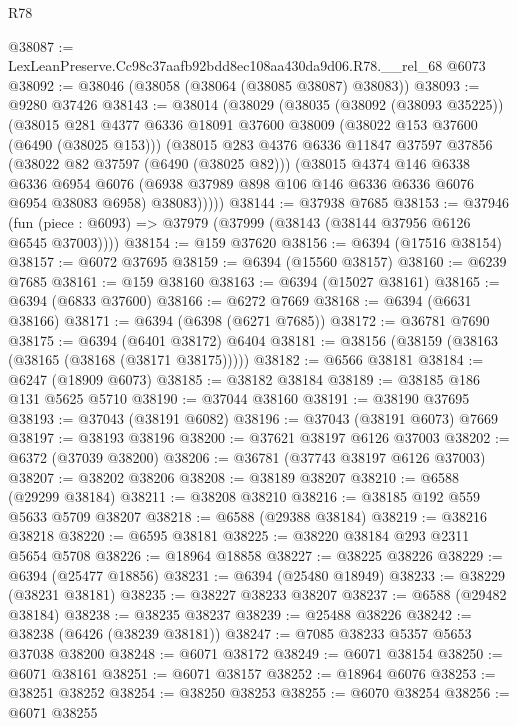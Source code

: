 \begin{lexlean}{R78}
\begin{coremodule}
@38087 := LexLeanPreserve.Cc98c37aafb92bdd8ec108aa430da9d06.R78.__rel_68 @6073
@38092 := @38046 (@38058 (@38064 (@38085 @38087) @38083))
@38093 := @9280 @37426
@38143 := @38014
    (@38029
      (@38035
        (@38092 (@38093 @35225))
        (@38015
          @281
          @4377
          @6336
          @18091
          @37600
          @38009
          (@38022 @153 @37600 (@6490 (@38025 @153)))
          (@38015
            @283
            @4376
            @6336
            @11847
            @37597
            @37856
            (@38022 @82 @37597 (@6490 (@38025 @82)))
            (@38015
              @4374
              @146
              @6338
              @6336
              @6954
              @6076
              (@6938 @37989 @898 @106 @146 @6336 @6336 @6076 @6954 @38083 @6958)
              @38083)))))
@38144 := @37938 @7685
@38153 := @37946
    (fun (piece : @6093) => @37979 (@37999 (@38143 (@38144 @37956 @6126 @6545 @37003))))
@38154 := @159 @37620
@38156 := @6394 (@17516 @38154)
@38157 := @6072 @37695
@38159 := @6394 (@15560 @38157)
@38160 := @6239 @7685
@38161 := @159 @38160
@38163 := @6394 (@15027 @38161)
@38165 := @6394 (@6833 @37600)
@38166 := @6272 @7669
@38168 := @6394 (@6631 @38166)
@38171 := @6394 (@6398 (@6271 @7685))
@38172 := @36781 @7690
@38175 := @6394 (@6401 @38172) @6404
@38181 := @38156 (@38159 (@38163 (@38165 (@38168 (@38171 @38175)))))
@38182 := @6566 @38181
@38184 := @6247 (@18909 @6073)
@38185 := @38182 @38184
@38189 := @38185 @186 @131 @5625 @5710
@38190 := @37044 @38160
@38191 := @38190 @37695
@38193 := @37043 (@38191 @6082)
@38196 := @37043 (@38191 @6073) @7669
@38197 := @38193 @38196
@38200 := @37621 @38197 @6126 @37003
@38202 := @6372 (@37039 @38200)
@38206 := @36781 (@37743 @38197 @6126 @37003)
@38207 := @38202 @38206
@38208 := @38189 @38207
@38210 := @6588 (@29299 @38184)
@38211 := @38208 @38210
@38216 := @38185 @192 @559 @5633 @5709 @38207
@38218 := @6588 (@29388 @38184)
@38219 := @38216 @38218
@38220 := @6595 @38181
@38225 := @38220 @38184 @293 @2311 @5654 @5708
@38226 := @18964 @18858
@38227 := @38225 @38226
@38229 := @6394 (@25477 @18856)
@38231 := @6394 (@25480 @18949)
@38233 := @38229 (@38231 @38181)
@38235 := @38227 @38233 @38207
@38237 := @6588 (@29482 @38184)
@38238 := @38235 @38237
@38239 := @25488 @38226
@38242 := @38238 (@6426 (@38239 @38181))
@38247 := @7085 @38233 @5357 @5653 @37038 @38200
@38248 := @6071 @38172
@38249 := @6071 @38154
@38250 := @6071 @38161
@38251 := @6071 @38157
@38252 := @18964 @6076
@38253 := @38251 @38252
@38254 := @38250 @38253
@38255 := @6070 @38254
@38256 := @6071 @38255

\end{coremodule}
\end{lexlean}
